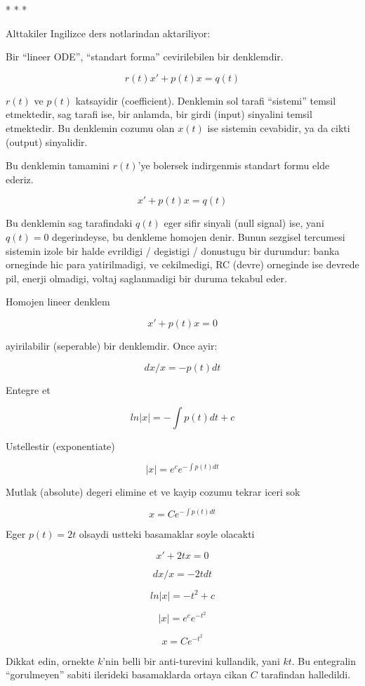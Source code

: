 \documentclass[12pt,fleqn]{article}\usepackage{../common}
\begin{document}
* * *

Alttakiler Ingilizce ders notlarindan aktariliyor:

Bir ``lineer ODE'', ``standart forma'' cevirilebilen bir denklemdir.

\[ r(t)x' + p(t)x = q(t) \]

$r(t)$ ve $p(t)$ katsayidir (coefficient). Denklemin sol tarafi ``sistemi''
temsil etmektedir, sag tarafi ise, bir anlamda, bir girdi (input) sinyalini
temsil etmektedir. Bu denklemin cozumu olan $x(t)$ ise sistemin cevabidir,
ya da cikti (output) sinyalidir. 

Bu denklemin tamamini $r(t)$'ye bolersek indirgenmis standart formu elde
ederiz. 

\[ x' + p(t)x = q(t) \]

Bu denklemin sag tarafindaki $q(t)$ eger sifir sinyali (null signal) ise,
yani $q(t) = 0$ degerindeyse, bu denkleme homojen denir. Bunun sezgisel
tercumesi sistemin izole bir halde evrildigi / degistigi / donustugu bir
durumdur: banka orneginde hic para yatirilmadigi, ve cekilmedigi, RC
(devre) orneginde ise devrede pil, enerji olmadigi, voltaj saglanmadigi bir
duruma tekabul eder. 

Homojen lineer denklem

\begin{equation}\label{4eq1}
x' + p(t) x = 0 
\end{equation}

ayirilabilir (seperable) bir denklemdir. Once ayir:

\[ dx/x = - p(t) dt \]

Entegre et

\[ ln|x| = - \int p(t) dt + c \]

Ustellestir (exponentiate)

\[ |x| = e^c e^{ - \int p(t) dt } \]

Mutlak (absolute) degeri elimine et ve kayip cozumu tekrar iceri sok

\[ x = C e^{- \int p(t) dt} \]

Eger $p(t) = 2t$ olsaydi ustteki basamaklar soyle olacakti

\[ x' + 2tx = 0 \]

\[ dx/x = - 2t dt \]

\[ ln|x| = - t^2 + c \]

\[ |x| = e^c e^{-t^2} \]

\[ x = C e^{-t^2} \]

Dikkat edin, ornekte $k$'nin belli bir anti-turevini kullandik, yani
$kt$. Bu entegralin ``gorulmeyen'' sabiti ilerideki basamaklarda ortaya
cikan $C$ tarafindan halledildi. 
\end{document}
